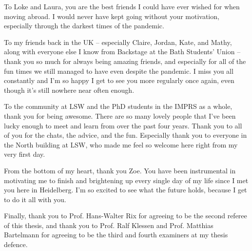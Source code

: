 
To Loke and Laura, you are the best friends I could have ever wished for when moving abroad. I would never have kept going without your motivation, especially through the darkest times of the pandemic. %

To my friends back in the UK -- especially Claire, Jordan, Kate, and Mathy, along with everyone else I know from Backstage at the Bath Students' Union -- thank you so much for always being amazing friends, and especially for all of the fun times we still managed to have even despite the pandemic. I miss you all constantly and I'm so happy I get to see you more regularly once again, even though it's still nowhere near often enough.

To the community at LSW and the PhD students in the IMPRS as a whole, thank you for being awesome. There are so many lovely people that I've been lucky enough to meet and learn from over the past four years. Thank you to all of you for the chats, the advice, and the fun. Especially thank you to everyone in the North building at LSW, who made me feel so welcome here right from my very first day.

From the bottom of my heart, thank you Zoe. You have been instrumental in motivating me to finish and brightening up every single day of my life since I met you here in Heidelberg. I'm so excited to see what the future holds, because I get to do it all with you.

Finally, thank you to Prof. Hans-Walter Rix for agreeing to be the second referee of this thesis, and thank you to Prof. Ralf Klessen and Prof. Matthias Bartelmann for agreeing to be the third and fourth examiners at my thesis defence. 


% 
